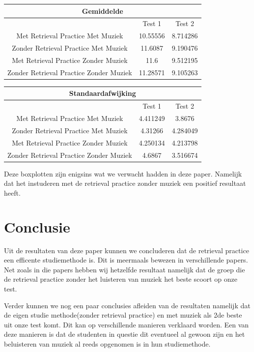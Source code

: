 \documentclass{hogent-article}
\begin{document}
	\begin{tabular}{ |c|c|c| }
	\hline
		\multicolumn{3}{|c|}{Gemiddelde} \\
	\hline
		& Test 1 & Test 2 \\
	\hline
		Met Retrieval Practice Met Muziek  & 10.55556 & 8.714286 \\
		Zonder Retrieval Practice Met Muziek & 11.6087 & 9.190476 \\
		Met Retrieval Practice Zonder Muziek & 11.6 & 9.512195 \\
		Zonder Retrieval Practice Zonder Muziek & 11.28571 & 9.105263 \\
	\hline
	\end{tabular}

	\begin{tabular}{ |c|c|c| }
	\hline
		\multicolumn{3}{|c|}{Standaardafwijking} \\
	\hline
		& Test 1 & Test 2 \\
	\hline
		Met Retrieval Practice Met Muziek  & 4.411249 & 3.8676\\
		Zonder Retrieval Practice Met Muziek & 4.31266 & 4.284049 \\
		Met Retrieval Practice Zonder Muziek & 4.250134  & 4.213798\\
		Zonder Retrieval Practice Zonder Muziek & 4.6867 & 3.516674 \\
	\hline
	\end{tabular}
	
	Deze boxplotten zijn enigsins wat we verwacht hadden in deze paper. Namelijk dat het instuderen met de retrieval practice zonder muziek een positief resultaat heeft.
	
	\section{Conclusie}
	Uit de resultaten van deze paper kunnen we concluderen dat de retrieval practice een efficente studiemethode is. Dit is meermaals bewezen in verschillende papers. Net zoals in die papers hebben wij hetzelfde resultaat namelijk dat de groep die de retrieval practice zonder het luisteren van muziek het beste scoort op onze test.
	
	Verder kunnen we nog een paar conclusies afleiden van de resultaten namelijk dat de eigen studie methode(zonder retrieval practice) en met muziek als 2de beste uit onze test komt. Dit kan op verschillende manieren verklaard worden. Een van deze manieren is dat de studenten in questie dit eventueel al gewoon zijn en het beluisteren van muziek al reeds opgenomen is in hun studiemethode. 
	
\end{document}
